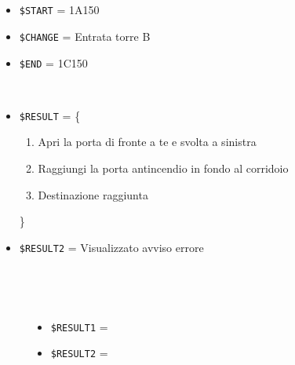 \documentclass[../../SperimentazioniPratiche.tex]{subfiles}
\begin{document}
			\paragraph*{}	
			\label{2Prova3A.1}	
			\begin{tcolorbox}[fonttitle=\bfseries, 
								adjusted title={\Large Prova 3A.1}, 
								breakable, 
								sharp corners=south,
								colback=white, 
								colframe=white!60!black]
								
				\begin{description}[leftmargin=0.7cm,labelwidth=!]
				
					\item[Input] \ \par 
        				\begin{itemize}
        					\item \verb|$START| = 1A150
							\item \verb|$CHANGE| = Entrata torre B
							\item \verb|$END| = 1C150
        				\end{itemize}
        				
        			\tcbline 
        				
        			\item[Output atteso] \ \par
        				\begin{itemize}
        					\item \verb|$RESULT| = \{
        					\begin{enumerate}
        						\item Apri la porta di fronte a te e svolta a sinistra
        						\item Raggiungi la porta antincendio in fondo al corridoio
        						\item Destinazione raggiunta
        					\end{enumerate}
        					\}
        					\item \verb|$RESULT2| = Visualizzato avviso errore
        				\end{itemize}

					\tcbline        				
        				
        			\item[Output riscontrato] \ \par
        				\begin{description}
        				
        					\item[\dispositivoA] \ \par
        					\begin{itemize}
        						\item \verb|$RESULT1| = \ok
        						\item \verb|$RESULT2| = \ok
        					\end{itemize}      					
        					

\end{description}
\end{description}
\end{tcolorbox}
\end{document}
